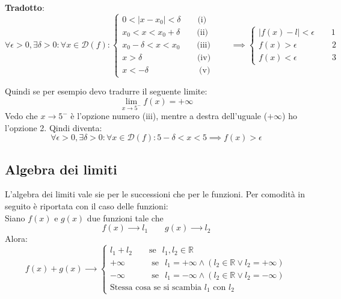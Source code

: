 \textbf{Tradotto}:
\begin{equation*}
    \forall \epsilon >0, \exists \delta > 0: \forall x \in \mathcal{D}(f) :
    \begin{cases*}
        0 < |x-x_0| < \delta \qquad \text{(i)}\\
        x_0 < x < x_0 + \delta \qquad \text{(ii)}\\
        x_0 - \delta < x < x_0 \qquad \text{(iii)}\\
        x > \delta \qquad \qquad\qquad\;\; \text{(iv)}\\
        x < - \delta \qquad \qquad\qquad \text{(v)}
    \end{cases*}
    \qquad
    \implies 
    \begin{cases*}
        |f(x) - l| < \epsilon \qquad 1\\
        f(x) > \epsilon \qquad\qquad\, 2\\
        f(x) < \epsilon \qquad\qquad\, 3
    \end{cases*}
\end{equation*}

Quindi se per esempio devo tradurre il seguente limite:
\begin{equation*}
	\lim_{x \to 5^-} f(x) = +\infty
\end{equation*}
Vedo che $x \to 5^-$ è l'opzione numero (iii), mentre a destra dell'uguale ($+\infty$) ho l'opzione 2. Qindi diventa:
\begin{equation*}
	\forall \epsilon > 0, \exists \delta > 0 : \forall x \in \mathcal{D}(f): 5 - \delta < x < 5 \implies f(x) > \epsilon
\end{equation*}

\subsection{Algebra dei limiti}
L'algebra dei limiti vale sie per le successioni che per le funzioni. Per comodità in seguito è riportata con il caso delle funzioni:\\
Siano $f(x)$ e $g(x)$ due funzioni tale che
\begin{equation*}
    f(x) \xrightarrow{\qquad} l_1 \qquad g(x) \xrightarrow{\qquad} l_2
\end{equation*}
Alora:
\begin{equation*}
    f(x)+g(x) \xrightarrow{\qquad}
    \begin{cases*}
        l_1 + l_2 \qquad \text{se}\;\;\, l_1,l_2 \in \mathbb{R}\\
        +\infty \quad\, \qquad \text{se}\;\;\, l_1 = +\infty \land (l_2 \in \mathbb{R} \lor l_2 = +\infty)\\
        -\infty \quad\, \qquad \text{se}\;\;\, l_1 = -\infty \land (l_2 \in \mathbb{R} \lor l_2 = -\infty)\\
        \text{Stessa cosa se si scambia $l_1$ con $l_2$}
    \end{cases*}
\end{equation*}

